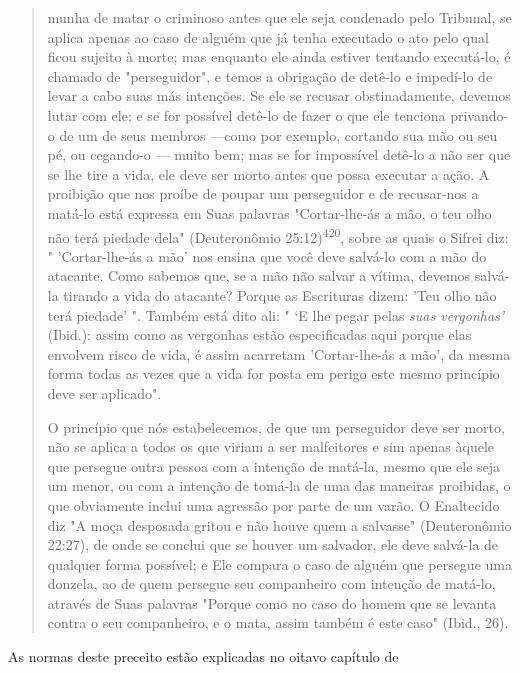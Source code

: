 \begin{quote}

munha de matar o criminoso antes que ele seja condenado pelo Tribunal,
se apli­ca apenas ao caso de alguém que já tenha executado o ato pelo
qual ficou sujeito à morte; mas enquanto ele ainda estiver tentando
executá-lo, é chamado de "per­seguidor", e temos a obrigação de detê-lo
e impedí-lo de levar a cabo suas más intenções. Se ele se recusar
obstinadamente, devemos lutar com ele; e se for pos­sível detê-lo de
fazer o que ele tenciona privando-o de um de seus membros ---como por
exemplo, cortando sua mão ou seu pé, ou cegando-o --- muito bem; mas se
for impossível detê-lo a não ser que se lhe tire a vida, ele deve ser
morto antes que possa executar a ação. A proibição que nos proíbe de
poupar um per­seguidor e de recusar-nos a matá-lo está expressa em Suas
palavras "Cortar-lhe-ás a mão, o teu olho não terá piedade dela"
(Deuteronômio 25:12)\textsuperscript{420}, sobre as quais o Sifrei diz:
" 'Cortar-lhe-ás a mão' nos ensina que você deve salvá-lo com a mão do
atacante. Como sabemos que, se a mão não salvar a vítima, devemos
salvá-la tirando a vida do atacante? Porque as Escrituras dizem: 'Teu
olho não terá piedade' ". Também está dito ali: " `E lhe pegar pelas
\emph{suas vergonhas'} (Ibid.): assim como as vergonhas estão
especificadas aqui porque elas envolvem risco de vida, é assim acarretam
'Cortar-lhe-ás a mão', da mesma forma todas as vezes que a vida for
posta em perigo este mesmo princípio deve ser aplicado".

O princípio que nós estabelecemos, de que um perseguidor deve ser morto,
não se aplica a todos os que viriam a ser malfeitores e sim apenas
àquele que persegue outra pessoa com a intenção de matá-la, mesmo que
ele seja um menor, ou com a intenção de tomá-la de uma das maneiras
proibidas, o que obviamente inclui uma agressão por parte de um varão. O
Enaltecido diz "A moça desposada gritou e não houve quem a salvasse"
(Deuteronômio 22:27), de onde se conclui que se houver um salvador, ele
deve salvá-la de qualquer forma possível; e Ele compara o caso de alguém
que persegue uma donzela, ao de quem persegue seu companheiro com
intenção de matá-lo, através de Suas palavras "Porque como no caso do
homem que se levanta contra o seu companheiro, e o mata, assim também é
este caso" (Ibid., 26).
\end{quote}

As normas deste preceito estão explicadas no oitavo capítulo de

